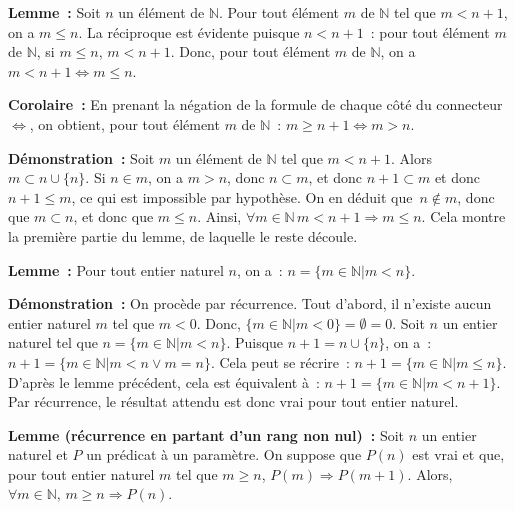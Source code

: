 \medskip

\noindent\textbf{Lemme :} 
    Soit $n$ un élément de $\mathbb{N}$. 
    Pour tout élément $m$ de $\mathbb{N}$ tel que $m < n+1$, on a $m \leq n$. 
    La réciproque est évidente puisque $n < n+1$ : pour tout élément $m$ de $\mathbb{N}$, si $m \leq n$, $m < n+1$. 
    Donc, pour tout élément $m$ de $\mathbb{N}$, on a $m < n+1 \Leftrightarrow m \leq n$. 

\medskip

\noindent\textbf{Corolaire :} 
    En prenant la négation de la formule de chaque côté du connecteur $\Leftrightarrow$, on obtient, pour tout élément $m$ de $\mathbb{N}$ : $m \geq n+1 \Leftrightarrow m > n$.

\medskip

\noindent\textbf{Démonstration :} 
    Soit $m$ un élément de $\mathbb{N}$ tel que $m < n+1$. 
    Alors $m \subset n \cup \lbrace n \rbrace$. 
    Si $n \in m$, on a $m > n$, donc $n \subset m$, et donc $n+1 \subset m$ et donc $n+1 \leq m$, ce qui est impossible par hypothèse. 
    On en déduit que $n \notin m$, donc que $m \subset n$, et donc que $m \leq n$. 
    Ainsi, $\forall m \in \mathbb{N}\, m < n+1 \Rightarrow m \leq n$. 
    Cela montre la première partie du lemme, de laquelle le reste découle. 
    
   \done 

\medskip

\noindent\textbf{Lemme :} 
    Pour tout entier naturel $n$, on a : $n = \lbrace m \in \mathbb{N} \vert m < n \rbrace$. 

\medskip

\noindent\textbf{Démonstration :} 
    On procède par récurrence. 
    Tout d'abord, il n'existe aucun entier naturel $m$ tel que $m < 0$. 
    Donc, $\lbrace m \in \mathbb{N} \vert m < 0 \rbrace = \emptyset = 0$. 
    Soit $n$ un entier naturel tel que $n = \lbrace m \in \mathbb{N} \vert m < n \rbrace$. 
    Puisque $n+1 = n \cup \lbrace n \rbrace$, on a : $n + 1 = \lbrace m \in \mathbb{N} \vert m < n \vee m = n \rbrace$. 
    Cela peut se récrire : $n + 1 = \lbrace m \in \mathbb{N} \vert m \leq n \rbrace$. 
    D'après le lemme précédent, cela est équivalent à : $n + 1 = \lbrace m \in \mathbb{N} \vert m < n + 1 \rbrace$. 
    Par récurrence, le résultat attendu est donc vrai pour tout entier naturel.
    
   \done 

\medskip

\noindent\textbf{Lemme (récurrence en partant d'un rang non nul) :} 
    Soit $n$ un entier naturel et $P$ un prédicat à un paramètre. 
    On suppose que $P(n)$ est vrai et que, pour tout entier naturel $m$ tel que $m \geq n$, $P(m) \Rightarrow P(m+1)$. 
    Alors, $\forall m \in \mathbb{N}, \, m \geq n \Rightarrow P(n)$.

